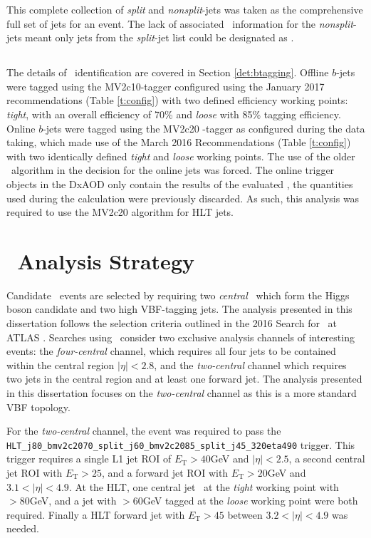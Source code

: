 		This complete collection of \textit{split} and \textit{nonsplit}-jets was taken as the comprehensive full set of jets for an event. The lack of associated \btag\ information for the \textit{nonsplit}-jets meant only jets from the \textit{split}-jet list could be designated as \bjets.

		\subsection{\bjets}

		The details of \bjet\ identification are covered in Section \ref{det:btagging}. Offline $b$-jets were tagged using the MV2c10-tagger configured using the January 2017 recommendations (Table \ref{t:config}) with two defined efficiency working points: \textit{tight}, with an overall efficiency of 70\% and \textit{loose} with 85\% tagging efficiency. Online $b$-jets were tagged using the MV2c20
		-tagger as configured during the data taking, which made use of the March 2016 Recommendations (Table \ref{t:config}) with two identically defined \textit{tight} and \textit{loose} working points. The use of the older \btagging\ algorithm in the decision for the online jets was forced. The online trigger objects in the DxAOD only contain the results of the evaluated \btag, the quantities used during the calculation were previously discarded. As such, this analysis was required to use the MV2c20 algorithm for HLT jets.


	\section{\VBFHBB\, Analysis Strategy}


	\label{es:as}
		Candidate \VBFHBB\, events are selected by requiring two \textit{central} \bjets\, which form the Higgs boson candidate and two high \pt VBF-tagging jets. The analysis presented in this dissertation follows the selection criteria outlined in the 2016 Search for \VBFHBB\ at ATLAS \cite{VBFHbb8tev}. Searches using \VBFHBB\, consider two exclusive analysis channels of interesting events: the \textit{four-central} channel, which requires all four jets to be contained within the central region $|\eta| < 2.8$, and the \textit{two-central} channel which requires two jets in the central region and at least one forward jet.
		The analysis presented in this dissertation focuses on the \textit{two-central} channel as this is a more standard VBF topology.

		For the \textit{two-central} channel, the event was required to pass the \texttt{HLT\_j80\_bmv2c2070\_split\_\-j60\_bmv2c2085\_split\_j45\_320eta490} trigger. This trigger requires a single L1 jet ROI of $E_\text{T} > 40$GeV and $|\eta| < 2.5$, a second central jet ROI with $E_\text{T} > 25$, and a forward jet ROI with $E_\text{T} > 20$GeV and $3.1 < |\eta| < 4.9$.
		At the HLT, one central jet \btagged\, at the \textit{tight} working point with \pt $>80$GeV, and a jet with \pt$>60$GeV tagged at the \textit{loose} working point were both required. Finally a HLT forward jet with $E_\text{T}>45$ between $3.2 < |\eta| < 4.9$ was needed.

